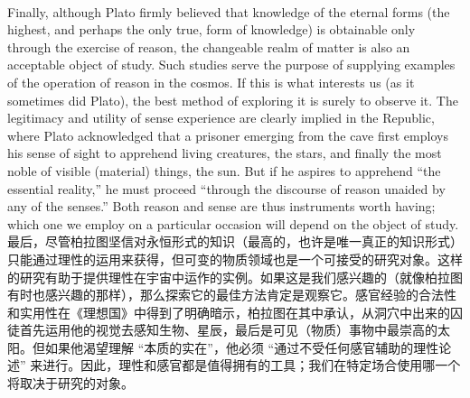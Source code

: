 \documentclass{article}
\begin{document}
\\
Finally, although Plato firmly believed that knowledge of the eternal forms (the highest, and perhaps the only true, form of knowledge) is obtainable only through the exercise of reason, the changeable realm of matter is also an acceptable object of study. Such studies serve the purpose of supplying examples of the operation of reason in the cosmos. If this is what interests us (as it sometimes did Plato), the best method of exploring it is surely to observe it. The legitimacy and utility of sense experience are clearly implied in the Republic, where Plato acknowledged that a prisoner emerging from the cave first employs his sense of sight to apprehend living creatures, the stars, and finally the most noble of visible (material) things, the sun. But if he aspires to apprehend “the essential reality,” he must proceed “through the discourse of reason unaided by any of the senses.” Both reason and sense are thus instruments worth having; which one we employ on a particular occasion will depend on the object of study.\\
最后，尽管柏拉图坚信对永恒形式的知识（最高的，也许是唯一真正的知识形式）只能通过理性的运用来获得，但可变的物质领域也是一个可接受的研究对象。这样的研究有助于提供理性在宇宙中运作的实例。如果这是我们感兴趣的（就像柏拉图有时也感兴趣的那样），那么探索它的最佳方法肯定是观察它。感官经验的合法性和实用性在《理想国》中得到了明确暗示，柏拉图在其中承认，从洞穴中出来的囚徒首先运用他的视觉去感知生物、星辰，最后是可见（物质）事物中最崇高的太阳。但如果他渴望理解 “本质的实在”，他必须 “通过不受任何感官辅助的理性论述” 来进行。因此，理性和感官都是值得拥有的工具；我们在特定场合使用哪一个将取决于研究的对象。\\
\end{document}
